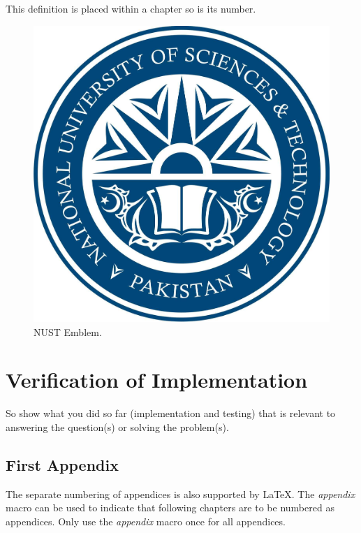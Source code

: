 \documentclass[11pt,a4paper,oneside]{book} %
\numberwithin{equation}{section}
\begin{document}
\begin{definition}[Testing 1,2,3]
This definition is placed within a chapter so is its number.
\end{definition}

\begin{figure}[http]
\begin{center}
  \includegraphics[width=0.7\columnwidth]{nust.jpg}
  \caption{NUST Emblem.}
  \label{f-nust}
\end{center}
\end{figure}


\chapter{Verification of Implementation}
\label{c-results}

So show what you did so far (implementation and testing) that is relevant to
answering the question(s) or solving the problem(s).


%


%
%
\printbibliography


%
\begin{appendix}
\chapter{First Appendix}
The separate numbering of appendices is also supported by LaTeX. The \textit{appendix} macro can be used to indicate that following chapters are to be numbered as appendices. Only use the \textit{appendix} macro once for all appendices.
\end{appendix}



\end{document}
